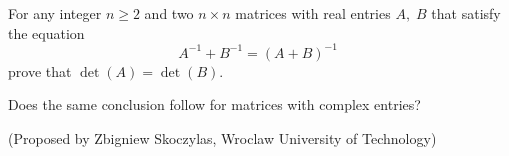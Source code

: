 For any integer $n\ge 2$ and two $n\times n$ matrices with real
entries $A,\; B$ that satisfy the equation
$$A^{-1}+B^{-1}=(A+B)^{-1}\;$$
prove that $\det (A)=\det(B)$.

Does the same conclusion follow for matrices with complex entries?

(Proposed by Zbigniew Skoczylas, Wroclaw University of Technology)
